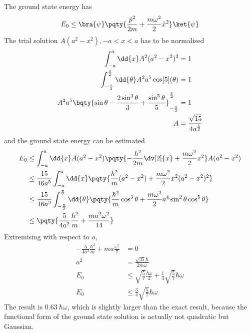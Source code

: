 \documentclass[12pt]{article}
\begin{document}
        \subsection{} The ground state energy has \[
            E_0 \leq \bra{\psi} \pqty{\frac{\hat{p}^2}{2m} + \frac{m\omega^2}{2}\hat{x}^2} \ket{\psi} 
        \]
        The trial solution \(A(a^2 - x^2), - a < x < a\) has to be normalised\begin{align*}
            \int_{ - a}^a \dd{x} A^2(a^2 - x^2)^2 &= 1\\
            \int_{ - \frac{\pi}{2}}^\frac{\pi}{2} \dd{\theta} A^2 a^5 \cos[5](\theta) &= 1\\
            A^2 a^5\bqty{\sin\theta - \frac{2\sin^3 \theta}{3} + \frac{\sin^5\theta}{5}}_{ - \frac{\pi}{2}}^\frac{\pi}{2} &= 1\\
            A &= \frac{\sqrt{15}}{4a^{\frac{5}{2}}}
        \end{align*}
        and the ground state energy can be estimated \begin{align*}
            E_0 &\leq \int_{ - a}^a \dd{x} A(a^2 - x^2)\pqty{ - \frac{\hbar^2}{2m}\dv[2]{x} + \frac{m\omega^2}{2}x^2}A(a^2 - x^2)\\
            &\leq \frac{15}{16a^5}\int_{ - a}^a \dd{x} \pqty{ \frac{\hbar^2}{m}(a^2 - x^2) + \frac{m\omega^2}{2}x^2(a^2 - x^2)^2}\\
            &\leq \frac{15}{16a^2}\int_{ - \frac{\pi}{2}}^\frac{\pi}{2} \dd{\theta} \pqty{ \frac{\hbar^2}{m}\cos^3\theta + \frac{m\omega^2}{2} a^4 \sin^2 \theta \cos^5 \theta}\\
            &\leq \pqty{\frac{5}{4a^2}\frac{\hbar^2}{m} + \frac{m a^2\omega^2}{14}}
        \end{align*}
        Extremising with respect to \(a\), \begin{align*}
            - \frac{5}{4a^3} \frac{\hbar^2}{m} + ma\frac{\omega^2}{7} &=  0\\
            a^2 &= \frac{\sqrt{35}\hbar}{2m\omega}\\
            E_0 &\leq \sqrt{\frac{5}{7}}\frac{\hbar\omega}{2} + \frac{1}{4}\sqrt{\frac{5}{7}}\hbar\omega\\
            E_0 &\leq \frac{3}{4}\sqrt{\frac{5}{7}}\hbar\omega
        \end{align*}
        The result is \(0.63\: \hbar\omega\), which is slightly larger than the exact result, because the functional form of the ground state solution is actually not quadratic but Gaussian.
\end{document}
